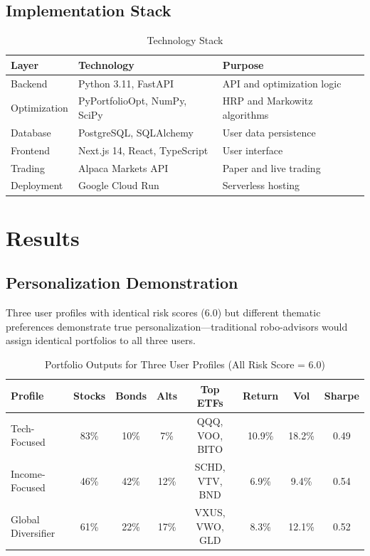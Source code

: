 \documentclass[11pt]{article}
\begin{document}
\subsection{Implementation Stack}

\begin{table}[H]
\centering
\caption{Technology Stack}
\label{tab:tech-stack}
\small
\begin{tabular}{lll}
\toprule
\textbf{Layer} & \textbf{Technology} & \textbf{Purpose} \\
\midrule
Backend & Python 3.11, FastAPI & API and optimization logic \\
Optimization & PyPortfolioOpt, NumPy, SciPy & HRP and Markowitz algorithms \\
Database & PostgreSQL, SQLAlchemy & User data persistence \\
Frontend & Next.js 14, React, TypeScript & User interface \\
Trading & Alpaca Markets API & Paper and live trading \\
Deployment & Google Cloud Run & Serverless hosting \\
\bottomrule
\end{tabular}
\end{table}



\section{Results}

\subsection{Personalization Demonstration}

Three user profiles with identical risk scores (6.0) but different thematic preferences demonstrate true personalization---traditional robo-advisors would assign identical portfolios to all three users.

\begin{table}[H]
\centering
\caption{Portfolio Outputs for Three User Profiles (All Risk Score = 6.0)}
\label{tab:personalization}
\small
\begin{tabular}{lccccccc}
\toprule
\textbf{Profile} & \textbf{Stocks} & \textbf{Bonds} & \textbf{Alts} & \textbf{Top ETFs} & \textbf{Return} & \textbf{Vol} & \textbf{Sharpe} \\
\midrule
Tech-Focused & 83\% & 10\% & 7\% & QQQ, VOO, BITO & 10.9\% & 18.2\% & 0.49 \\
Income-Focused & 46\% & 42\% & 12\% & SCHD, VTV, BND & 6.9\% & 9.4\% & 0.54 \\
Global Diversifier & 61\% & 22\% & 17\% & VXUS, VWO, GLD & 8.3\% & 12.1\% & 0.52 \\
\bottomrule
\end{tabular}
\end{table}
\end{document}
